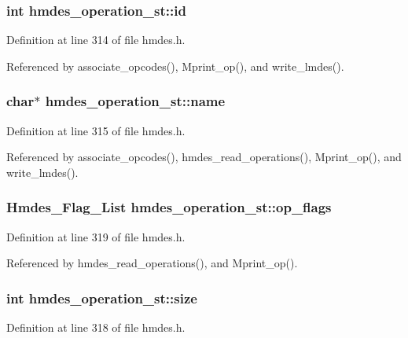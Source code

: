 \subsubsection{\setlength{\rightskip}{0pt plus 5cm}int \bf{hmdes\_\-operation\_\-st::id}}\label{structhmdes__operation__st_3b1ab0398e5c7e017e1d45c3cd08ac66}




Definition at line 314 of file hmdes.h.

Referenced by associate\_\-opcodes(), Mprint\_\-op(), and write\_\-lmdes().
\subsubsection{\setlength{\rightskip}{0pt plus 5cm}char$\ast$ \bf{hmdes\_\-operation\_\-st::name}}\label{structhmdes__operation__st_fbe2e96895b480490df7a363822240ad}




Definition at line 315 of file hmdes.h.

Referenced by associate\_\-opcodes(), hmdes\_\-read\_\-operations(), Mprint\_\-op(), and write\_\-lmdes().
\subsubsection{\setlength{\rightskip}{0pt plus 5cm}\bf{Hmdes\_\-Flag\_\-List} \bf{hmdes\_\-operation\_\-st::op\_\-flags}}\label{structhmdes__operation__st_8879a131601f287239c317188d8551d1}




Definition at line 319 of file hmdes.h.

Referenced by hmdes\_\-read\_\-operations(), and Mprint\_\-op().
\subsubsection{\setlength{\rightskip}{0pt plus 5cm}int \bf{hmdes\_\-operation\_\-st::size}}\label{structhmdes__operation__st_941b5fcc89daeafda815b79a0e4699ef}




Definition at line 318 of file hmdes.h.

